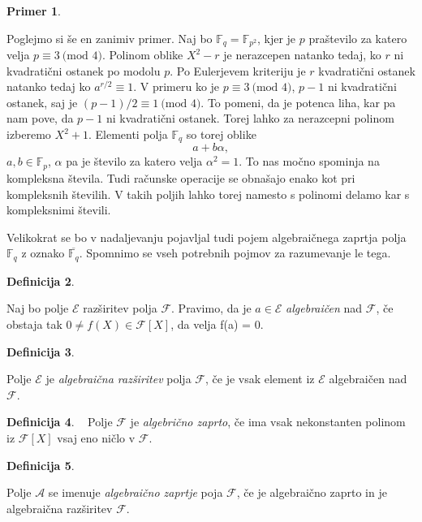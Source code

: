 \documentclass[12pt,a4paper,twoside]{article}
\theoremstyle{definition} %
\newtheorem{definicija}{Definicija}[section]
\newtheorem{primer}[definicija]{Primer}
\theoremstyle{plain} %
\numberwithin{equation}{section}  %
\newcommand{\F}{\mathbb F}
\newcommand{\MOD}[1]{\ \text{(mod }{#1}\text{)}}
\begin{document}
\begin{primer}~

Poglejmo si še en zanimiv primer. Naj bo $\F_q= \F_{p^2}$, kjer je $p$ praštevilo za katero velja $p \equiv 3 \MOD{4}$.  Polinom oblike $X^2-r$ je nerazcepen natanko tedaj, ko $r$ ni kvadratični ostanek po modolu $p$. Po  Eulerjevem kriteriju je $r$ kvadratični ostanek natanko tedaj ko $a^{r/2} \equiv 1$. V primeru ko je $p \equiv 3 \MOD{4}$, $p-1$ ni kvadratični ostanek, saj je $(p-1)/2 \equiv 1 \MOD{4}$. To pomeni, da je potenca liha, kar pa nam pove, da $p-1$ ni kvadratični ostanek. Torej lahko za nerazcepni polinom izberemo $X^2+1$. Elementi polja $\F_q$ so torej oblike
$$a+b\alpha,$$
$a,b \in \F_p$, $\alpha$ pa je število za katero velja $\alpha^2 = 1$. To nas močno spominja na kompleksna števila. Tudi računske operacije se obnašajo enako kot pri kompleksnih številih. V takih poljih lahko torej namesto s polinomi delamo kar s kompleksnimi števili.
\end{primer}

Velikokrat se bo v nadaljevanju pojavljal tudi pojem algebraičnega zaprtja polja $\F_q$ z oznako $\overline{\F_q}$. Spomnimo se vseh potrebnih pojmov za razumevanje le tega.

\begin{definicija}~

Naj bo polje $\mathcal{E}$ razširitev polja $\mathcal{F}$. Pravimo, da je $a \in \mathcal{E}$ \emph{algebraičen}
nad $\mathcal{F}$, če obstaja tak $0 \neq f(X) \in \mathcal{F}[X]$, da velja f(a) = 0.

\end{definicija}

\begin{definicija}~

Polje $\mathcal{E}$ je \emph{algebraična razširitev} polja $\mathcal{F}$, če je vsak element
iz $\mathcal{E}$ algebraičen nad $\mathcal{F}$.
\end{definicija}

\begin{definicija}~
Polje $\mathcal{F}$ je \emph{algebrično zaprto}, če ima vsak nekonstanten polinom
iz $\mathcal{F} [X]$ vsaj eno ničlo v $\mathcal{F}$.
\end{definicija}

\begin{definicija}~

Polje $\mathcal{A}$ se imenuje \emph{algebraično zaprtje} poja $\mathcal{F}$, če je algebraično
zaprto in je algebraična razširitev $\mathcal{F}$.
\end{definicija}
\end{document}
